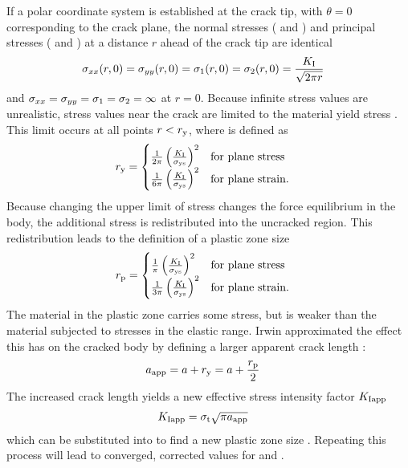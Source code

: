 If a polar coordinate system is established at the crack tip, with \(\theta=0\) corresponding to the crack plane, the normal stresses (\Sxx{} and \Syy{}) and principal stresses (\Sone{} and \Stwo{}) at a distance \(r\) ahead of the crack tip are identical
\begin{align}
\sigma_{xx}(r,0) &= \sigma_{yy}(r,0) = \sigma_{1}(r,0) = \sigma_{2}(r,0) = \frac{K_\textnormal{I}}{\sqrt{2\pi r}} \label{eq:singularity}
\end{align}
and \(\sigma_{xx} = \sigma_{yy} = \sigma_{1} = \sigma_{2} = \infty\) at \(r=0\).
Because infinite stress values are unrealistic, stress values near the crack are limited to the material yield stress \Sys{}.
This limit occurs at all points \(r<r_{\textnormal{y}}\), where \ry{} is defined as
  \begin{align}
  r_{\textnormal{y}} &=
    \begin{cases}
      \frac{1}{2\pi} \left( \frac{K_\textnormal{I}}{\sigma_{\textnormal{ys}}} \right)^2 & \textnormal{for plane stress} \\
      \frac{1}{6\pi} \left( \frac{K_\textnormal{I}}{\sigma_{\textnormal{ys}}} \right)^2 & \textnormal{for plane strain.} \\
    \end{cases} \label{eq:ry}
  \end{align}
Because changing the upper limit of stress changes the force equilibrium in the body, the additional stress is redistributed into the uncracked region.
This redistribution leads to the definition of a plastic zone size \rp{}
\begin{align}
  r_{\textnormal{p}} &=
    \begin{cases}
      \frac{1}{\pi} \left( \frac{K_\textnormal{I}}{\sigma_{\textnormal{ys}}} \right)^2 & \textnormal{for plane stress} \\
      \frac{1}{3\pi} \left( \frac{K_\textnormal{I}}{\sigma_{\textnormal{ys}}} \right)^2 & \textnormal{for plane strain.}
    \end{cases} \label{eq:rp}
\end{align}
The material in the plastic zone carries some stress, but is weaker than the material subjected to stresses in the elastic range.
Irwin approximated the effect this has on the cracked body by defining a larger apparent crack length \aapp:
\begin{align}
a_{\textnormal{app}} &= a+r_{\textnormal{y}} = a + \frac{r_{\textnormal{p}}}{2}
\end{align}
The increased crack length yields a new effective stress intensity factor \(K_{\textnormal{Iapp}}\)
\begin{align}
K_{\textnormal{Iapp}} &= \sigma_{\textnormal{t}} \sqrt{\pi a_{\textnormal{app}}} \label{eq:kiapp}
\end{align}
which can be substituted into  to find a new plastic zone size \rp.
Repeating this process will lead to converged, corrected values for \KI and \aapp.

